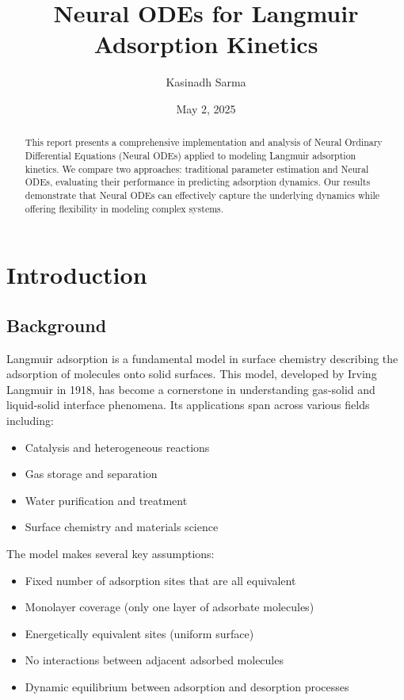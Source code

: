 \documentclass[12pt]{article}
\title{\textbf{Neural ODEs for Langmuir Adsorption Kinetics}}
\author{Kasinadh Sarma}
\date{May 2, 2025}
\begin{document}

\maketitle
\clearpage

\begin{abstract}
This report presents a comprehensive implementation and analysis of Neural Ordinary Differential Equations (Neural ODEs) applied to modeling Langmuir adsorption kinetics. We compare two approaches: traditional parameter estimation and Neural ODEs, evaluating their performance in predicting adsorption dynamics. Our results demonstrate that Neural ODEs can effectively capture the underlying dynamics while offering flexibility in modeling complex systems.
\end{abstract}
\clearpage


\tableofcontents
\clearpage

\section{Introduction}

\subsection{Background}
Langmuir adsorption is a fundamental model in surface chemistry describing the adsorption of molecules onto solid surfaces. This model, developed by Irving Langmuir in 1918, has become a cornerstone in understanding gas-solid and liquid-solid interface phenomena. Its applications span across various fields including:

\begin{itemize}
    \item Catalysis and heterogeneous reactions
    \item Gas storage and separation
    \item Water purification and treatment
    \item Surface chemistry and materials science
\end{itemize}

The model makes several key assumptions:
\begin{itemize}
    \item Fixed number of adsorption sites that are all equivalent
    \item Monolayer coverage (only one layer of adsorbate molecules)
    \item Energetically equivalent sites (uniform surface)
    \item No interactions between adjacent adsorbed molecules
    \item Dynamic equilibrium between adsorption and desorption processes
\end{itemize}
\end{document}
